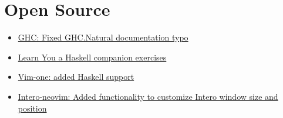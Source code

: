 \section{Open Source}

\begin{itemize}
	\item \href{https://github.com/ghc/ghc/commit/36c1431d9d2d06049190cc0888dbfaee8e2179d6}{GHC: Fixed GHC.Natural documentation typo}
	\item \href{https://github.com/bbc/haskell-workshop/tree/master/learnYouAHaskellExercises}{Learn You a Haskell companion exercises}
	\item \href{https://github.com/rakr/vim-one/commit/8e1118ecec916e1334694a44ef29db70fb679682}{Vim-one: added Haskell support}
	\item \href{https://github.com/parsonsmatt/intero-neovim/commit/26d340ab0d6e8d40cbafaf72dac0588ae901c117}{Intero-neovim: Added functionality to customize Intero window size and position}
\end{itemize}
